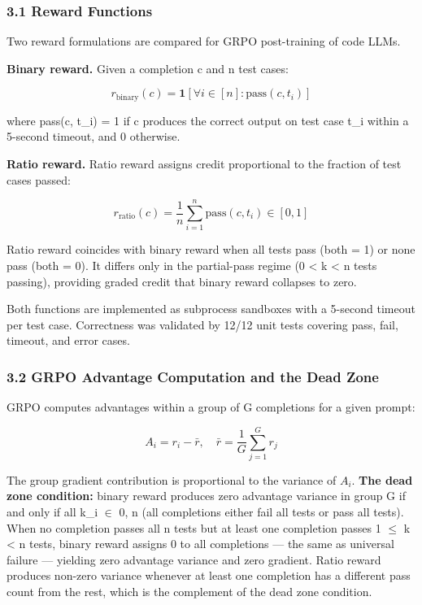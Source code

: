 
\subsubsection{3.1 Reward Functions}

Two reward formulations are compared for GRPO post-training of code LLMs.

\textbf{Binary reward.} Given a completion c and n test cases:

$$r_{\text{binary}}(c) = \mathbf{1}\!\left[\forall i \in [n]: \text{pass}(c, t_i)\right]$$

where pass(c, t\_i) = 1 if c produces the correct output on test case t\_i within a 5-second timeout, and 0 otherwise.

\textbf{Ratio reward.} Ratio reward assigns credit proportional to the fraction of test cases passed:

$$r_{\text{ratio}}(c) = \frac{1}{n} \sum_{i=1}^{n} \text{pass}(c, t_i) \in [0, 1]$$

Ratio reward coincides with binary reward when all tests pass (both = 1) or none pass (both = 0). It differs only in the partial-pass regime (0 < k < n tests passing), providing graded credit that binary reward collapses to zero.

Both functions are implemented as subprocess sandboxes with a 5-second timeout per test case. Correctness was validated by 12/12 unit tests covering pass, fail, timeout, and error cases.

\subsubsection{3.2 GRPO Advantage Computation and the Dead Zone}

GRPO computes advantages within a group of G completions for a given prompt:

$$A_i = r_i - \bar{r}, \quad \bar{r} = \frac{1}{G}\sum_{j=1}^{G} r_j$$

The group gradient contribution is proportional to the variance of {$A_i$}. \textbf{The dead zone condition:} binary reward produces zero advantage variance in group G if and only if all k\_i $\in$ {0, n} (all completions either fail all tests or pass all tests). When no completion passes all n tests but at least one completion passes 1 $\leq$ k < n tests, binary reward assigns 0 to all completions --- the same as universal failure --- yielding zero advantage variance and zero gradient. Ratio reward produces non-zero variance whenever at least one completion has a different pass count from the rest, which is the complement of the dead zone condition.

